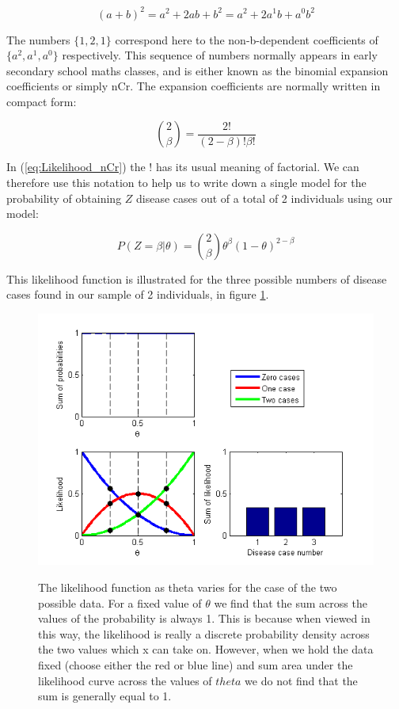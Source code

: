 \documentclass[11pt,fullpage]{book}
\begin{document}
\begin{equation}
(a+b)^2 = a^2 + 2ab + b^2 = a^2 + 2a^1b + a^0b^2
\end{equation}\label{eq:Likelihood_quadratic}

The numbers $\{1,2,1\}$ correspond here to the non-b-dependent coefficients of $\{a^2,a^1,a^0\}$ respectively. This sequence of numbers normally appears in early secondary school maths classes, and is either known as the binomial expansion coefficients or simply nCr. The expansion coefficients are normally written in compact form:

\begin{equation}
{2 \choose \beta} = \frac{2!}{(2-\beta)!\beta!}
\end{equation}\label{eq:Likelihood_nCr}

In (\ref{eq:Likelihood_nCr}) the $!$ has its usual meaning of factorial. We can therefore use this notation to help us to write down a single model for the probability of obtaining $Z$ disease cases out of a total of 2 individuals using our model:

\begin{equation}
P(Z=\beta|\theta) = {2 \choose \beta} \theta^\beta (1-\theta)^{2-\beta}
\end{equation}\label{eq:Likelihood_binomialTwoFull}

This likelihood function is illustrated for the three possible numbers of disease cases found in our sample of 2 individuals, in figure \ref{fig:Likelihood_binomial}.

\begin{figure}
\centering
\scalebox{0.75} 
{\includegraphics{likelihood_binomial.png}}
\caption{The likelihood function as theta varies for the case of the two possible data. For a fixed value of $\theta$ we find that the sum across the values of the probability is always 1. This is because when viewed in this way, the likelihood is really a discrete probability density across the two values which x can take on. However, when we hold the data fixed (choose either the red or blue line) and sum area under the likelihood curve across the values of $theta$ we do not find that the sum is generally equal to 1. }\label{fig:Likelihood_binomial}
\end{figure}
\end{document}
